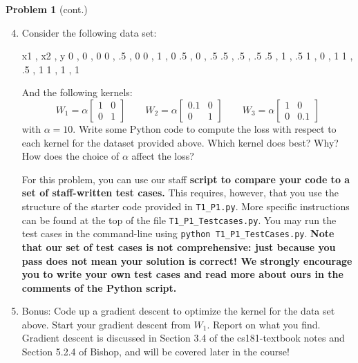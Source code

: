 \documentclass[submit]{harvardml}
\begin{document}
\newpage

\begin{framed}
\noindent\textbf{Problem 1} (cont.)\\
\begin{enumerate}
\setcounter{enumi}{3}
\item Consider the following data set:
\begin{csv}
x1 , x2 , y
  0 , 0 , 0
  0 , .5 , 0
  0 , 1 , 0
  .5 , 0 , .5
  .5 , .5 , .5
  .5 , 1 , .5
  1 , 0 , 1
  1 , .5 , 1
  1 , 1 , 1
\end{csv}
And the following kernels:
\begin{equation*}
W_1 = \alpha \begin{bmatrix}
  1 & 0 \\
  0 & 1
\end{bmatrix}
\qquad
W_2 = \alpha \begin{bmatrix}
  0.1 & 0 \\
  0 & 1
\end{bmatrix}
\qquad
W_3 = \alpha \begin{bmatrix}
  1 & 0 \\
  0 & 0.1
\end{bmatrix}
\end{equation*}
with $\alpha = 10$. Write some Python code to compute the loss with
respect to each kernel for the dataset provided above. Which kernel
does best?  Why?  How does the choice of $\alpha$ affect the loss?

For this problem, you can use our staff \textbf{script to compare your code to a set of staff-written test cases.} This requires, however, that you use the structure of the starter code provided in \texttt{T1\_P1.py}. More specific instructions can be found at the top of the file \texttt{T1\_P1\_Testcases.py}. You may run the test cases in the command-line using \texttt{python T1\_P1\_TestCases.py}.
\textbf{Note that our set of test cases is not comprehensive: just because you pass does not mean your solution is correct! We strongly encourage you to write your own test cases and read more about ours in the comments of the Python script.}

\item Bonus:  Code up a gradient descent to
  optimize the kernel for the data set above.  Start your gradient
  descent from $W_1$.  Report on what you find.\\
  Gradient descent is discussed in Section 3.4 of the cs181-textbook notes and Section 5.2.4 of Bishop, and will be covered later in the course!

\end{enumerate}

\end{framed}
\end{document}
